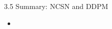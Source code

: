 \begin{frame}{3.5 Summary: NCSN and DDPM}
    \begin{itemize}
        \item
    \end{itemize}
\end{frame}
